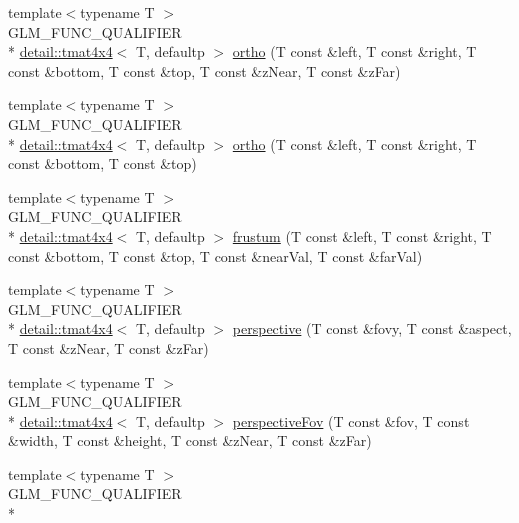 \begin{DoxyCompactItemize}
\item 
{\footnotesize template$<$typename T $>$ }\\G\-L\-M\-\_\-\-F\-U\-N\-C\-\_\-\-Q\-U\-A\-L\-I\-F\-I\-E\-R \\*
\hyperlink{structglm_1_1detail_1_1tmat4x4}{detail\-::tmat4x4}$<$ T, defaultp $>$ \hyperlink{group__gtc__matrix__transform_gac393e9262776e4980731c386123e4377}{ortho} (T const \&left, T const \&right, T const \&bottom, T const \&top, T const \&z\-Near, T const \&z\-Far)
\item 
{\footnotesize template$<$typename T $>$ }\\G\-L\-M\-\_\-\-F\-U\-N\-C\-\_\-\-Q\-U\-A\-L\-I\-F\-I\-E\-R \\*
\hyperlink{structglm_1_1detail_1_1tmat4x4}{detail\-::tmat4x4}$<$ T, defaultp $>$ \hyperlink{group__gtc__matrix__transform_gab03587bce3510aa5d2f4e5f1be6c2370}{ortho} (T const \&left, T const \&right, T const \&bottom, T const \&top)
\item 
{\footnotesize template$<$typename T $>$ }\\G\-L\-M\-\_\-\-F\-U\-N\-C\-\_\-\-Q\-U\-A\-L\-I\-F\-I\-E\-R \\*
\hyperlink{structglm_1_1detail_1_1tmat4x4}{detail\-::tmat4x4}$<$ T, defaultp $>$ \hyperlink{group__gtc__matrix__transform_ga486d3d6819c04880559f3dccd38f9f58}{frustum} (T const \&left, T const \&right, T const \&bottom, T const \&top, T const \&near\-Val, T const \&far\-Val)
\item 
{\footnotesize template$<$typename T $>$ }\\G\-L\-M\-\_\-\-F\-U\-N\-C\-\_\-\-Q\-U\-A\-L\-I\-F\-I\-E\-R \\*
\hyperlink{structglm_1_1detail_1_1tmat4x4}{detail\-::tmat4x4}$<$ T, defaultp $>$ \hyperlink{group__gtc__matrix__transform_ga6c82aa0ea748cfbb16887d81cf6c5a10}{perspective} (T const \&fovy, T const \&aspect, T const \&z\-Near, T const \&z\-Far)
\item 
{\footnotesize template$<$typename T $>$ }\\G\-L\-M\-\_\-\-F\-U\-N\-C\-\_\-\-Q\-U\-A\-L\-I\-F\-I\-E\-R \\*
\hyperlink{structglm_1_1detail_1_1tmat4x4}{detail\-::tmat4x4}$<$ T, defaultp $>$ \hyperlink{group__gtc__matrix__transform_gac00bf68d4f7ec62380b84c5354567f71}{perspective\-Fov} (T const \&fov, T const \&width, T const \&height, T const \&z\-Near, T const \&z\-Far)
\item 
{\footnotesize template$<$typename T $>$ }\\G\-L\-M\-\_\-\-F\-U\-N\-C\-\_\-\-Q\-U\-A\-L\-I\-F\-I\-E\-R \\*

\end{DoxyCompactItemize}
